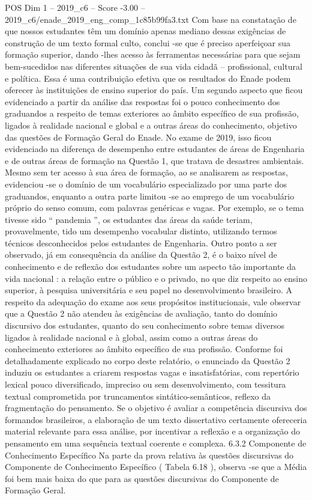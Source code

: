 \begin{textsample}{POS Dim 1 – 2019\_c6 – Score -3.00 – 2019\_c6/enade\_2019\_eng\_comp\_1c85b99fa3.txt}
Com base na constatação de que nossos estudantes têm um domínio apenas mediano dessas exigências de construção de um texto formal culto, conclui -se que é preciso aperfeiçoar sua formação superior, dando -lhes acesso às ferramentas necessárias para que sejam bem-sucedidos nas diferentes situações de sua vida cidadã – profissional, cultural e política.
Essa é uma contribuição efetiva que os resultados do Enade podem oferecer às instituições de ensino superior do país.
Um segundo aspecto que ficou evidenciado a partir da análise das respostas foi o pouco conhecimento dos graduandos a respeito de temas exteriores ao âmbito específico de sua profissão, ligados à realidade nacional e global e a outras áreas do conhecimento, objetivo das questões de Formação Geral do Enade.
No exame de 2019, isso ficou evidenciado na diferença de desempenho entre estudantes de áreas de Engenharia e de outras áreas de formação na Questão 1, que tratava de desastres ambientais.
Mesmo sem ter acesso à sua área de formação, ao se analisarem as respostas, evidenciou -se o domínio de um vocabulário especializado por uma parte dos graduandos, enquanto a outra parte limitou -se ao emprego de um vocabulário próprio do senso comum, com palavras genéricas e vagas.
Por exemplo, se o tema tivesse sido “ pandemia ”, os estudantes das áreas da saúde teriam, provavelmente, tido um desempenho vocabular distinto, utilizando termos técnicos desconhecidos pelos estudantes de Engenharia.
Outro ponto a ser observado, já em consequência da análise da Questão 2, é o baixo nível de conhecimento e de reflexão dos estudantes sobre um aspecto tão importante da vida nacional : a relação entre o público e o privado, no que diz respeito ao ensino superior, à pesquisa universitária e seu papel no desenvolvimento brasileiro.
A respeito da adequação do exame aos seus propósitos institucionais, vale observar que a Questão 2 não atendeu às exigências de avaliação, tanto do domínio discursivo dos estudantes, quanto do seu conhecimento sobre temas diversos ligados à realidade nacional e à global, assim como a outras áreas do conhecimento exteriores ao âmbito específico de sua profissão.
Conforme foi detalhadamente explicado no corpo deste relatório, o enunciado da Questão 2 induziu os estudantes a criarem respostas vagas e insatisfatórias, com repertório lexical pouco diversificado, impreciso ou sem desenvolvimento, com tessitura textual comprometida por truncamentos sintático-semânticos, reflexo da fragmentação do pensamento.
Se o objetivo é avaliar a competência discursiva dos formandos brasileiros, a elaboração de um texto dissertativo certamente ofereceria material relevante para essa análise, por incentivar a reflexão e a organização do pensamento em uma sequência textual coerente e complexa. 6.3.2 Componente de Conhecimento Específico Na parte da prova relativa às questões discursivas do Componente de Conhecimento Específico ( Tabela 6.18 ), observa -se que a Média foi bem mais baixa do que para as questões discursivas do Componente de Formação Geral.

\end{textsample}
